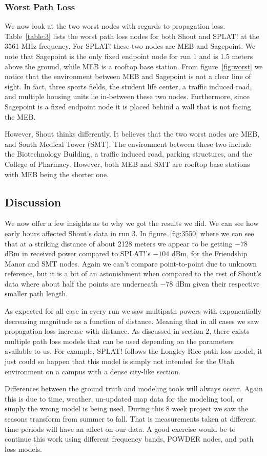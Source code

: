\subsubsection*{Worst Path Loss}
We now look at the two worst nodes with regards to propagation loss. Table~\ref{table:3} lists the worst path loss nodes for both Shout and SPLAT!
at the 3561 MHz frequency. For SPLAT! these two nodes are MEB and Sagepoint. We note that Sagepoint is the only fixed endpoint node for run 1
and is 1.5 meters above the ground, while MEB is a rooftop base station. From figure~\ref{fig:worst} we notice that the environment between MEB 
and Sagepoint is not a clear line of sight. In fact, three sports fields, the student life center, a traffic induced road, and multiple housing units lie 
in-between these two nodes. Furthermore, since Sagepoint is a fixed endpoint node it is placed behind a wall that is not facing the MEB. 

However, Shout thinks differently. It believes that the two worst nodes are MEB, and South Medical Tower (SMT).
The environment between these two include the Biotechnology Building, a traffic induced road, parking structures, and the College of Pharmacy.
However, both MEB and SMT are rooftop base stations with MEB being the shorter one. 

\subsection*{Discussion}
We now offer a few insights as to why we got the results we did. We can see how early hours affected Shout's data in run 3. In figure~\ref{fig:3550}
where we can see that at a striking distance of about 2128 meters we appear to be getting $-78$ dBm in received power compared to SPLAT!'s
$-104$ dBm, for the Friendship Manor and SMT nodes. Again we can't compare point-to-point due to unknown reference, but it is a bit of an astonishment
when compared to the rest of Shout's data where about half the points are underneath $-78$ dBm given their respective smaller path length.

As expected for all case in every run we saw multipath powers with exponentially decreasing magnitude as a function of distance. Meaning
that in all cases we saw propagation loss increase with distance. As discussed in section 2, there exists multiple path loss models that can be
used depending on the parameters available to us. For example, SPLAT! follows the Longley-Rice path loss model, it just could so happen that
this model is simply not intended for the Utah environment on a campus with a dense city-like section. 

Differences between the ground truth and modeling tools will always occur. Again this is due to time, weather, un-updated map data for the modeling 
tool, or simply the wrong model is being used. During this 8 week project we saw the seasons transform from summer to fall. That is measurements
taken at different time periods will have an affect on our data. A good exercise would be to continue this work using different frequency bands, POWDER
nodes, and path loss models. 


